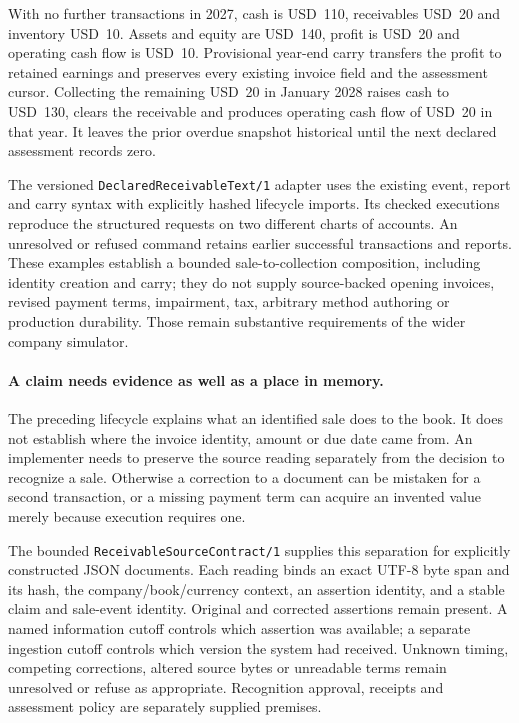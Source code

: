 With no further transactions in 2027, cash is USD~110, receivables USD~20 and
inventory USD~10. Assets and equity are USD~140, profit is USD~20 and operating
cash flow is USD~10. Provisional year-end carry transfers the profit to
retained earnings and preserves every existing invoice field and the
assessment cursor. Collecting the remaining USD~20 in January 2028 raises
cash to USD~130, clears the receivable and produces operating cash flow of
USD~20 in that year. It leaves the prior overdue snapshot historical until
the next declared assessment records zero.

The versioned \texttt{DeclaredReceivableText/1} adapter uses the existing
event, report and carry syntax with explicitly hashed lifecycle imports.
Its checked executions reproduce the structured requests on two different
charts of accounts. An unresolved or refused command retains earlier
successful transactions and reports. These examples establish a bounded
sale-to-collection composition, including identity creation and carry; they
do not supply source-backed opening invoices, revised payment terms,
impairment, tax, arbitrary method authoring or production durability. Those
remain substantive requirements of the wider company simulator.


\paragraph{A claim needs evidence as well as a place in memory.}
The preceding lifecycle explains what an identified sale does to the book.
It does not establish where the invoice identity, amount or due date came
from. An implementer needs to preserve the source reading separately from the
decision to recognize a sale. Otherwise a correction to a document can be
mistaken for a second transaction, or a missing payment term can acquire an
invented value merely because execution requires one.

The bounded \texttt{ReceivableSourceContract/1} supplies this separation for
explicitly constructed JSON documents. Each reading binds an exact UTF-8 byte
span and its hash, the company/book/currency context, an assertion identity,
and a stable claim and sale-event identity. Original and corrected assertions
remain present. A named information cutoff controls which assertion was
available; a separate ingestion cutoff controls which version the system had
received. Unknown timing, competing corrections, altered source bytes or
unreadable terms remain unresolved or refuse as appropriate. Recognition
approval, receipts and assessment policy are separately supplied premises.

